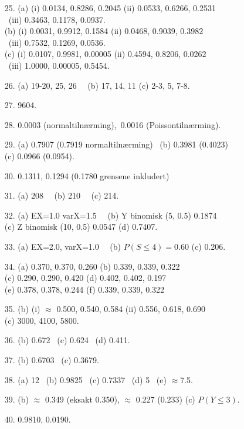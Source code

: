 \begin{itemize}
              (e)  l.645 \ (f)  0.675.
\item[25.]  (a)  (i) 0.0134, 0.8286, 0.2045   (ii) 0.0533, 0.6266, 0.2531\\
               \    (iii) 0.3463, 0.1178, 0.0937.\\
              (b)  (i) 0.0031, 0.9912, 0.1584   (ii) 0.0468, 0.9039, 0.3982\\
               \    (iii) 0.7532, 0.1269, 0.0536.\\
              (c)  (i) 0.0107, 0.9981, 0.00005  (ii) 0.4594, 0.8206, 0.0262\\
                \   (iii) 1.0000, 0.00005, 0.5454.
\item[26.]  (a) 19-20, 25, 26  \ \  (b) 17, 14, 11  (c) 2-3, 5, 7-8.
\item[27.]  9604.     
\item[28.]  0.0003 (normaltilnærming),\  0.0016 (Poissontilnærming).
\item[29.]  (a) 0.7907 (0.7919 normaltilnærming) \ (b) 0.3981 (0.4023)\\
              (c) 0.0966 (0.0954).
\item[30.]   0.1311, 0.1294 (0.1780 grensene inkludert)
\item[31.]  (a) 208 \ \   (b) 210 \ \   (c) 214.
\item[32.]  (a) EX=1.0  varX=1.5 \ \  (b) Y binomisk (5, 0.5) 0.1874\\
              (c) Z binomisk (10, 0.5) 0.0547   (d) 0.7407.
\item[33.]  (a) EX=2.0,  varX=1.0 \ \   (b) $P(S\leq 4)=0.60$    (c) 0.206.
\item[34.]  (a) 0.370, 0.370, 0.260   (b) 0.339, 0.339, 0.322\\
              (c) 0.290, 0.290, 0.420   (d) 0.402, 0.402, 0.197\\
              (e) 0.378, 0.378, 0.244   (f) 0.339, 0.339, 0.322
\item[35.]  (b) (i) $\approx$ 0.500, 0.540, 0.584   (ii) 0.556, 0.618, 0.690\\
              (c) 3000, 4100, 5800.
\item[36.]  (b) 0.672  \ (c) 0.624 \  (d) 0.411.
\item[37.]  (b) 0.6703 \ (c) 0.3679.
\item[38.]  (a) 12 \  (b) 0.9825  \ (c) 0.7337  \ (d) 5  \ (e) $\approx$7.5.
\item[39.]  (b) $\approx$ 0.349 (eksakt 0.350), $\approx$ 0.227 (0.233)
   (c) $P(Y\leq 3)$.
\item[40.]  0.9810, 0.0190.

\end{itemize}
